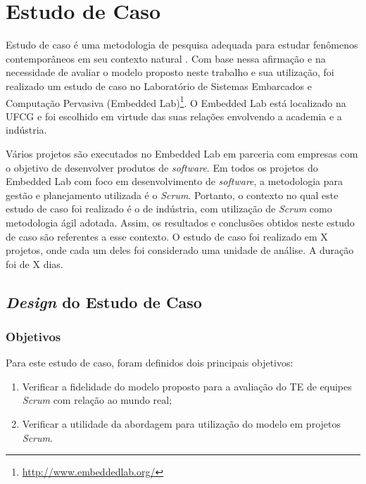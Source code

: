 \chapter{Estudo de Caso}
\label{estudodecaso}

Estudo de caso é uma metodologia de pesquisa adequada para estudar fenômenos contemporâneos em seu contexto natural \cite{runeson}. Com base nessa afirmação e na necessidade de avaliar o modelo proposto neste trabalho e sua utilização, foi realizado um estudo de caso no Laboratório de Sistemas Embarcados e Computação Pervasiva (Embedded Lab)\footnote{\url{http://www.embeddedlab.org/}}. O Embedded Lab está localizado na UFCG e foi escolhido em virtude das suas relações envolvendo a academia e a indústria.

Vários projetos são executados no Embedded Lab em parceria com empresas com o objetivo de desenvolver produtos de \textit{software}. Em todos os projetos do Embedded Lab com foco em desenvolvimento de \textit{software}, a metodologia para gestão e planejamento utilizada é o \textit{Scrum}. Portanto, o contexto no qual este estudo de caso foi realizado é o de indústria, com utilização de \textit{Scrum} como metodologia ágil adotada. Assim, os resultados e conclusões obtidos neste estudo de caso são referentes a esse contexto. O estudo de caso foi realizado em X projetos, onde cada um deles foi considerado uma unidade de análise. {\color{red} A duração foi de X dias.}

\section{\textit{Design} do Estudo de Caso}
\label{estudodecaso:design}

\subsection{Objetivos}
\label{estudodecaso:design:objetivos}

Para este estudo de caso, foram definidos dois principais objetivos:

\begin{enumerate}
  \item Verificar a fidelidade do modelo proposto para a avaliação do TE de equipes \textit{Scrum} com relação ao mundo real;
  \item Verificar a utilidade da abordagem para utilização do modelo em projetos \textit{Scrum}.
\end{enumerate}

